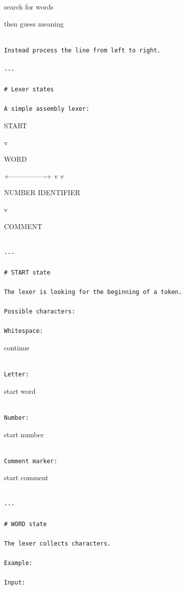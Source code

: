 \documentclass[
  oneside,
  openany]{book}
\begin{document}
search for words

then guess meaning

\begin{verbatim}

Instead process the line from left to right.

---

# Lexer states

A simple assembly lexer:
\end{verbatim}

START

\hfill\break

v

WORD

+----------------+ \textbar{} \textbar{} v v

NUMBER IDENTIFIER

v

COMMENT

\begin{verbatim}

---

# START state

The lexer is looking for the beginning of a token.

Possible characters:

Whitespace:
\end{verbatim}

continue

\begin{verbatim}

Letter:
\end{verbatim}

start word

\begin{verbatim}

Number:
\end{verbatim}

start number

\begin{verbatim}

Comment marker:
\end{verbatim}

start comment

\begin{verbatim}

---

# WORD state

The lexer collects characters.

Example:

Input:
\end{verbatim}
\end{document}
